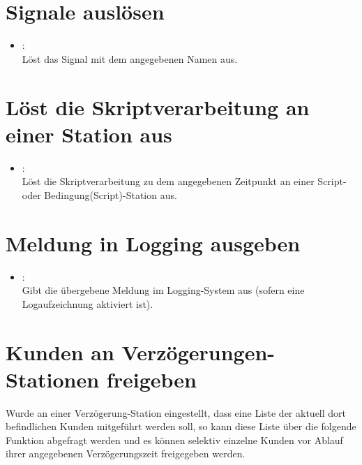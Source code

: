 \section{Signale auslösen}

\begin{itemize}

\item
{}:\\
Löst das Signal mit dem angegebenen Namen aus.

\end{itemize}

\section{Löst die Skriptverarbeitung an einer Station aus}

\begin{itemize}

\item
{}:\\
Löst die Skriptverarbeitung zu dem angegebenen Zeitpunkt an einer Script- oder Bedingung(Script)-Station aus.

\end{itemize}

\section{Meldung in Logging ausgeben}

\begin{itemize}

\item
{}:\\
Gibt die übergebene Meldung im Logging-System aus (sofern eine Logaufzeichnung aktiviert ist).

\end{itemize}

\section{Kunden an Verzögerungen-Stationen freigeben}

Wurde an einer Verzögerung-Station eingestellt, dass eine Liste der aktuell dort befindlichen Kunden
mitgeführt werden soll, so kann diese Liste über die folgende Funktion abgefragt werden und es können
selektiv einzelne Kunden vor Ablauf ihrer angegebenen Verzögerungszeit freigegeben werden.


